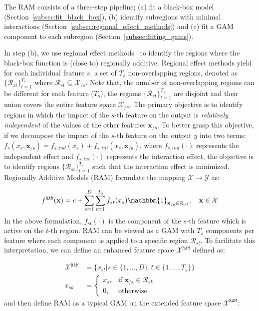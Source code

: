 \documentclass[runningheads]{llncs}
\newcommand{\xb}{\mathbf{x}}
\newcommand{\xcc}{\mathbf{x_{/s}}}
\newcommand{\Xcal}{\mathcal{X}}
\newcommand{\when}[1]{\mathbbm{1}_{#1}}
\begin{document}
The RAM consists of a three-step pipeline; (a) fit a black-box model (Section~\ref{subsec:fit_black_box}),
(b) identify subregions with minimal interactions (Section~\ref{subsec:regional_effect_methods}) and
(c) fit a GAM component to each subregion (Section~\ref{subsec:fitting_gams}).

In step (b), we use regional effect methods~\citep{herbinger2023decomposing, herbinger2022repid}
to identify the regions where the black-box function is (close to) regionally additive.
Regional effect methods yield for each individual feature \(s\), a set of \(T_s\) non-overlapping regions,
denoted as \(\{\mathcal{R}_{st}\}_{t=1}^{T_s}\) where \(\mathcal{R}_{st} \subseteq \Xcal_{/s}\).
Note that, the number of non-overlapping regions can be different for each feature ($T_s$),
the regions \(\{\mathcal{R}_{st}\}_{t=1}^{T_s}\) are disjoint
and their union covers the entire feature space \(\Xcal_{/s}\).
The primary objective is to identify regions in which the impact of the \(s\)-th feature on the output is
\textit{relatively independent} of the values of the other features \(\xcc\).
To better grasp this objective, if we decompose the impact of the \(s\)-th feature on the output $y$ into two terms:
\(f_s(x_s, \xcc) = f_{s,ind}(x_s) + f_{s, int}(x_s, \xcc)\),
where \(f_{s,ind}(\cdot)\) represents the independent effect
and \(f_{s, int}(\cdot)\) represents the interaction effect,
the objective is to identify regions \(\{\mathcal{R}_{st}\}_{t=1}^{T_s}\) such that the interaction effect is minimized.
Regionally Additive Models (RAM) formulate the mapping \(\mathcal{X} \rightarrow \mathcal{Y}\) as:

\begin{equation}
\label{eq:ram_formulation}
f^{\mathtt{RAM}}(\xb) = c + \sum_{s=1}^D \sum_{t=1}^{T_s} f_{st}(x_s) \when{\xcc \in \mathcal{R}_{st}}, \quad \xb \in \Xcal
\end{equation}
%
In the above formulation, \(f_{st}(\cdot)\) is the component of the \(s\)-th feature which is active on the \(t\)-th region.
RAM can be viewed as a GAM with \(T_s\) components per feature where each component is applied to a specific region \(\mathcal{R}_{st}\).
To facilitate this interpretation, we can define an enhanced feature space \(\Xcal^\mathtt{RAM}\) defined as:

\begin{equation}
\label{eq:ram_feature_space}
\begin{aligned}
\Xcal^{\mathtt{RAM}} &= \{x_{st} | s \in \{1, \ldots, D\}, t \in \{1, \ldots, T_s\}\} \\
x_{sk} &= \begin{cases}
x_s, & \text{if } \xcc \in \mathcal{R}_{sk} \\
0, & \text{otherwise}
\end{cases}
\end{aligned}
\end{equation}
%
and then define RAM as a typical GAM on the extended feature space \(\Xcal^{\mathtt{RAM}}\):
\end{document}
